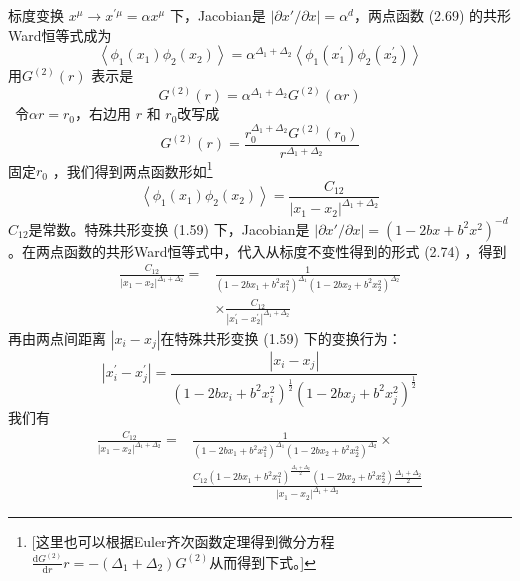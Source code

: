 标度变换 $x^{\mu} \rightarrow x^{\prime \mu}=\alpha x^{\mu}$ 下，Jacobian是 $|\partial x'/\partial x|=\alpha^d $，两点函数 (2.69) 的共形Ward恒等式成为
\begin{equation}
	\left\langle\phi_{1}\left(x_{1}\right) \phi_{2}\left(x_{2}\right)\right\rangle=\alpha^{\Delta_{1}+\Delta_{2}}\left\langle\phi_{1}\left(x_{1}^{\prime}\right) \phi_{2}\left(x_{2}^{\prime}\right)\right\rangle
\end{equation}
用$ G^{(2)}(r)$ 表示是
\begin{equation}
	G^{(2)}(r)=\alpha^{\Delta_{1}+\Delta_{2}} G^{(2)}(\alpha r)
\end{equation}\
令$\alpha r=r_0 $，右边用 $r$ 和 $r_0 $改写成
\begin{equation}
	G^{(2)}(r)=\frac{r_{0}^{\Delta_{1}+\Delta_{2}} G^{(2)}\left(r_{0}\right)}{r^{\Delta_{1}+\Delta_{2}}}
\end{equation}
固定$ r_0$ ，我们得到两点函数形如\footnote{[这里也可以根据Euler齐次函数定理得到微分方程$\frac{\mathrm{d}G^{(2)}}{\mathrm{d}r}r=-\left(\Delta_1+\Delta_2\right)G^{(2)}$从而得到下式。]}
\begin{equation}
	\left\langle\phi_{1}\left(x_{1}\right) \phi_{2}\left(x_{2}\right)\right\rangle=\frac{C_{12}}{\left|x_{1}-x_{2}\right|^{\Delta_{1}+\Delta_{2}}}
\end{equation}
$C_{12} $是常数。特殊共形变换 (1.59) 下，Jacobian是 $|\partial x'/\partial x|=\left(1-2 b x+b^{2} x^{2}\right)^{-d}$ 。在两点函数的共形Ward恒等式中，代入从标度不变性得到的形式 (2.74) ，得到
\begin{equation}
	\begin{aligned} \frac{C_{12}}{\left|x_{1}-x_{2}\right|^{\Delta_{1}+\Delta_{2}}}=& \frac{1}{\left(1-2 b x_{1}+b^{2} x_{1}^{2}\right)^{\Delta_{1}}\left(1-2 b x_{2}+b^{2} x_{2}^{2}\right)^{\Delta_{2}}} \\ & \times \frac{C_{12}}{\left|x_{1}^{\prime}-x_{2}^{\prime}\right|^{\Delta_{1}+\Delta_{2}}} \end{aligned}
\end{equation}
再由两点间距离 $|x_i-x_j| $在特殊共形变换 (1.59) 下的变换行为：
\begin{equation}
	\left|x_{i}^{\prime}-x_{j}^{\prime}\right|=\frac{\left|x_{i}-x_{j}\right|}{\left(1-2 b x_{i}+b^{2} x_{i}^{2}\right)^{\frac{1}{2}}\left(1-2 b x_{j}+b^{2} x_{j}^{2}\right)^{\frac{1}{2}}}
\end{equation}
我们有
\begin{equation}
	\begin{aligned} \frac{C_{12}}{\left|x_{1}-x_{2}\right|^{\Delta_{1}+\Delta_{2}}}=& \frac{1}{\left(1-2 b x_{1}+b^{2} x_{1}^{2}\right)^{\Delta_{1}}\left(1-2 b x_{2}+b^{2} x_{2}^{2}\right)^{\Delta_{2}}} \times \\ & \frac{C_{12}\left(1-2 b x_{1}+b^{2} x_{1}^{2}\right)^{\frac{\Delta_{1}+\Delta_{2}}{2}}\left(1-2 b x_{2}+b^{2} x_{2}^{2}\right) \frac{\Delta_{1}+\Delta_{2}}{2}}{\left|x_{1}-x_{2}\right|^{\Delta_{1}+\Delta_{2}}} \end{aligned}
\end{equation}
